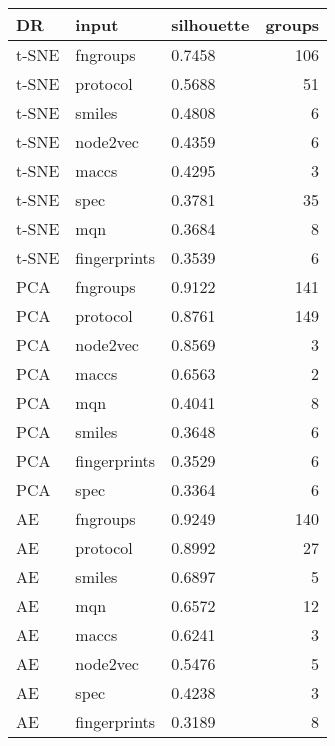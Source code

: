 \begin{tabular}{lllr}
\toprule
    DR &         input & silhouette &  groups \\
\midrule
 t-SNE &      fngroups &     0.7458 &     106 \\
 t-SNE &      protocol &     0.5688 &      51 \\
 t-SNE &        smiles &     0.4808 &       6 \\
 t-SNE &      node2vec &     0.4359 &       6 \\
 t-SNE &         maccs &     0.4295 &       3 \\
 t-SNE &          spec &     0.3781 &      35 \\
 t-SNE &           mqn &     0.3684 &       8 \\
 t-SNE &  fingerprints &     0.3539 &       6 \\
   PCA &      fngroups &     0.9122 &     141 \\
   PCA &      protocol &     0.8761 &     149 \\
   PCA &      node2vec &     0.8569 &       3 \\
   PCA &         maccs &     0.6563 &       2 \\
   PCA &           mqn &     0.4041 &       8 \\
   PCA &        smiles &     0.3648 &       6 \\
   PCA &  fingerprints &     0.3529 &       6 \\
   PCA &          spec &     0.3364 &       6 \\
    AE &      fngroups &     0.9249 &     140 \\
    AE &      protocol &     0.8992 &      27 \\
    AE &        smiles &     0.6897 &       5 \\
    AE &           mqn &     0.6572 &      12 \\
    AE &         maccs &     0.6241 &       3 \\
    AE &      node2vec &     0.5476 &       5 \\
    AE &          spec &     0.4238 &       3 \\
    AE &  fingerprints &     0.3189 &       8 \\
\bottomrule
\end{tabular}